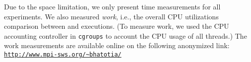  Due to the space limitation, we only present  time measurements for all experiments. We also measured  {\em work}, i.e., the overall CPU utilizations comparison between \pthreads and \projecttitle executions. (To measure work, we used the CPU accounting controller in {\tt cgroups} to account the CPU usage of all threads.) The work measurements are available online on the following anonymized link:  \href{http://www.mpi-sws.org/\~bhatotia/}{\tt http://www.mpi-sws.org/\textasciitilde bhatotia/}







%
%
%
%
%

